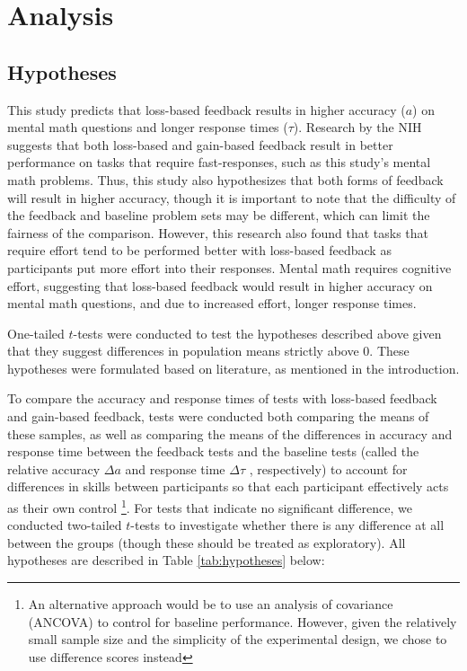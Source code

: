 \documentclass[12pt]{exam}
\begin{document}
\section{Analysis}
\subsection{Hypotheses}

This study predicts that loss-based feedback results in higher accuracy ($a$) on mental math questions and longer response times ($\tau$). Research by the NIH \cite{nih-paper} suggests that both loss-based and gain-based feedback result in better performance on tasks that require fast-responses, such as this study’s mental math problems. Thus, this study also hypothesizes that both forms of feedback will result in higher accuracy, though it is important to note that the difficulty of the feedback and baseline problem sets may be different, which can limit the fairness of the comparison. However, this research also found that tasks that require effort tend to be performed better with loss-based feedback as participants put more effort into their responses. Mental math requires cognitive effort, suggesting that loss-based feedback would result in higher accuracy on mental math questions, and due to increased effort, longer response times.\newline

One-tailed $t$-tests were conducted to test the hypotheses described above given that they suggest differences in population means strictly above 0. These hypotheses were formulated based on literature, as mentioned in the introduction.\cite{prospect-theory}

To compare the accuracy and response times of tests with loss-based feedback and gain-based feedback, tests were conducted both comparing the means of these samples, as well as comparing the means of the differences in accuracy and response time between the feedback tests and the baseline tests (called the relative accuracy $\Delta a$  and response time $\Delta\tau$ , respectively) to account for differences in skills between participants so that each participant effectively acts as their own control \footnote{An alternative approach would be to use an analysis of covariance (ANCOVA) to control for baseline performance. However, given the relatively small sample size and the simplicity of the experimental design, we chose to use difference scores instead}. For tests that indicate no significant difference, we conducted two-tailed $t$-tests to investigate whether there is any difference at all between the groups (though these should be treated as exploratory). All hypotheses are described in Table \ref{tab:hypotheses} below:
\end{document}
